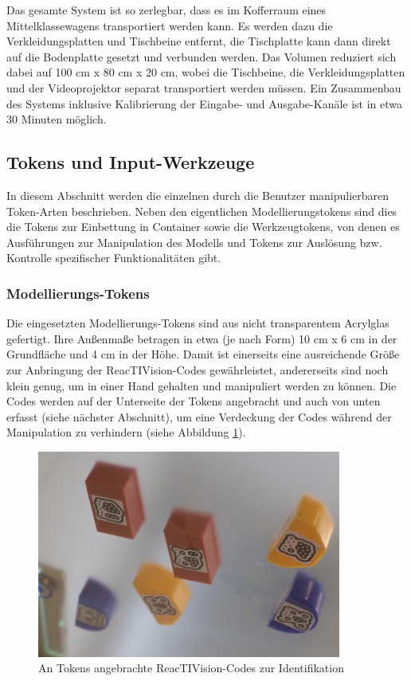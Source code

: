 Das gesamte System ist so zerlegbar, dass es im Kofferraum eines Mittelklassewagens transportiert werden kann. Es werden dazu die Verkleidungsplatten und Tischbeine entfernt, die Tischplatte kann dann direkt auf die Bodenplatte gesetzt und verbunden werden. Das Volumen reduziert sich dabei auf 100 cm x 80 cm x 20 cm, wobei die Tischbeine, die Verkleidungsplatten und der Videoprojektor separat transportiert werden müssen. Ein Zusammenbau des Systems inklusive {K}alibrierung der Eingabe- und Ausgabe-Kanäle ist in etwa 30 Minuten möglich.


\subsection{Tokens und Input-Werkzeuge} %
\label{sub:tokens_&_input_werkzeuge}

In diesem Abschnitt werden die einzelnen durch die Benutzer manipulierbaren Token-Arten beschrieben. Neben den eigentlichen Modellierungstokens sind dies die Tokens zur Einbettung in Container sowie die Werkzeugtokens, von denen es Ausführungen zur Manipulation des Modells und Tokens zur Auslösung bzw. Kontrolle spezifischer Funktionalitäten gibt.

\subsubsection{Modellierungs-Tokens} %
\label{subs:modellierungs_tokens}

Die eingesetzten Modellierungs-Tokens sind aus nicht transparentem Acrylglas gefertigt. Ihre Außenmaße betragen in etwa (je nach Form) 10 cm x 6 cm in der Grundfläche und 4 cm in der Höhe. Damit ist einerseits eine ausreichende Größe zur Anbringung der ReacTIVision-Codes gewährleistet, andererseits sind noch klein genug, um in einer Hand gehalten und manipuliert werden zu können. Die Codes werden auf der Unterseite der Tokens angebracht und auch von unten erfasst (siehe nächster Abschnitt), um eine Verdeckung der Codes während der Manipulation zu verhindern (siehe Abbildung \ref{fig:img_ImplementierungInput_TokensCodes}).

\begin{figure}[htbp]
	\centering
		\includegraphics[width=10cm]{img/ImplementierungInput/TokensCodes.jpg}
	\caption{An Tokens angebrachte ReacTIVision-Codes zur Identifikation}
	\label{fig:img_ImplementierungInput_TokensCodes}
\end{figure}

